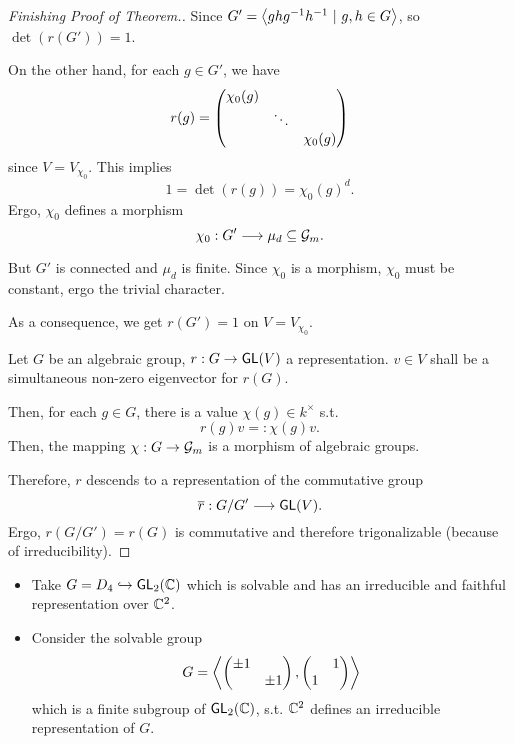 \begin{proof}[Finishing Proof of Theorem.]
	Since $G' = \left<ghg^{-1} h^{-1} ~|~ g,h \in G\right>$, so $\det(r(G')) = 1$.
	
	On the other hand, for each $g \in G'$, we have
	\[
	r(g) = \left(\begin{matrix} 
		\chi_0(g) \\
		& \ddots \\
		& & \chi_0(g)
	 \end{matrix}\right)
	\]
	since $V = V_{\chi_0}$. This implies
	\[ 1 = \det(r(g)) = \chi_0(g)^d. \]
	Ergo, $\chi_0$ defines a morphism
	\[ \chi_0 : G' \overset{}{\longrightarrow} \mu_d \subseteq \mathcal{G}_m. \]
	
	But $G'$ is connected and $\mu_d$ is finite. Since $\chi_0$ is a morphism, $\chi_0$ must be constant, ergo the trivial character.
	
	As a consequence, we get $r(G') = 1$ on $V = V_{\chi_0}$.
	
	\begin{lemma}
		Let $G$ be an algebraic group, $r : G \overset{}{\rightarrow} \textsf{GL}(V)$ a representation. $v \in V$ shall be a simultaneous non-zero eigenvector for $r(G)$.
		
		Then, for each $g \in G$, there is a value $\chi(g) \in k^\times$ s.t.
		\[ r(g) v =: \chi(g)v. \]
		Then, the mapping $\chi : G \overset{}{\rightarrow} \mathcal{G}_m$ is a morphism of algebraic groups.
	\end{lemma}
	
	Therefore, $r $ descends to a representation of the commutative group
	\[ \overline{r} : G / G' \overset{}{\longrightarrow} \textsf{GL}(V). \]
	Ergo, $r(G / G') = r(G)$ is commutative and therefore trigonalizable (because of irreducibility).
	
\end{proof}


\begin{example}
\begin{itemize}
	\item Take $ G = D_4 \overset{}{\hookrightarrow} \textsf{GL}_2(\mathbb{C})$ which is solvable and has an irreducible and faithful representation over $\mathbb{C}^2$. 
	\item Consider the solvable group
	\[ G = \left<\left(\begin{matrix} \pm 1 \\ & \pm 1 \end{matrix}\right), \left(\begin{matrix} & 1 \\ 1 \end{matrix}\right)\right> \]
	which is a finite subgroup of $\textsf{GL}_2(\mathbb{C})$, s.t. $\mathbb{C}^2$ defines an irreducible representation of $G$.
\end{itemize}
\end{example}

